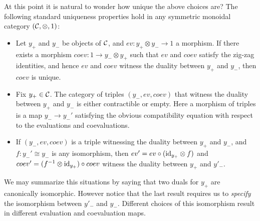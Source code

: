 \documentclass{amsart}
\begin{document}
At this point it is natural to wonder how unique the above choices are? The following standard uniqueness properties hold in any symmetric monoidal category $(\mathcal C,\otimes,1)$: 
\begin{itemize}
	\item Let $y_+$ and $ y_-$ be objects of $\mathcal C$, and $ev: y_+ \otimes y_- \to 1$ a morphism.  If there exists a morphism $coev: 1 \to y_- \otimes y_+$ such that $ev$ and  $coev$ satisfy the zig-zag identities, and hence $ev$ and $coev$ witness the duality between $y_+$ and $y_-$, then $coev$ is unique.
	\item Fix $y_+ \in \mathcal C$. The category of triples $(y_-, ev, coev)$ that witness the duality between $y_+$ and $y_-$ is either contractible or empty.  Here a morphism of triples is a map $y_- \to y_-'$ satisfying the obvious compatibility equation with respect to the evaluations and coevaluations.  
	\item If $(y_-, ev, coev)$ is a triple witnessing the duality between $y_+$ and $y_-$, and $f:y_-' \cong y_-$ is any isomorphism, then $ev' = ev \circ (\mathrm{id}_{y_+} \otimes f)$ and $coev' = (f^{-1} \otimes \mathrm{id}_{y_+}) \circ coev$ witness the duality between $y_+$ and $y'_-$.  
\end{itemize}
We may summarize this situations by saying that two duals for $y_+$ are canonically isomorphic.
However notice that the last result requires us to {\em specify} the isomorphism between $y'_-$ and $y_-$. Different choices of this isomorphism result in different evaluation and coevaluation maps. 
\end{document}
